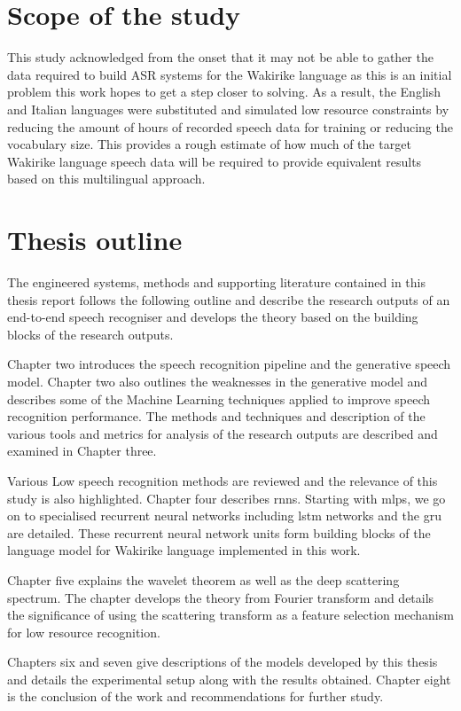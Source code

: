 \section{Scope of the study}
This study acknowledged from the onset that it may not be able to gather the data required to build ASR systems for the Wakirike language as this is an initial problem this work hopes to get a step closer to solving.  As a result, the English and Italian languages were substituted and simulated low resource constraints by reducing the amount of hours of recorded speech data for training or reducing the vocabulary size.  This provides a rough estimate of how much of the target Wakirike language speech data will be required to provide equivalent results based on this multilingual approach.
\stopblue

\section{Thesis outline}
The engineered systems, methods and supporting literature contained in this thesis report follows the following outline and describe the research outputs of an end-to-end speech recogniser and develops the theory based on the building blocks of the research outputs.

Chapter two introduces the speech recognition pipeline and the generative speech model.  Chapter two also outlines the weaknesses in the generative model and describes some of the Machine Learning techniques applied to improve speech recognition performance.  The methods and techniques and description of the various tools and metrics for analysis of the research outputs are described and examined in Chapter three.

Various Low speech recognition methods are reviewed and the relevance of this study is also highlighted.  Chapter four describes \acrfull{rnns}. Starting with \acrfull{mlps}, we go on to specialised recurrent neural networks including \acrfull{lstm} networks and the \acrfull{gru} are detailed. These recurrent neural network units form building blocks of the language model for Wakirike language implemented in this work.

Chapter five explains the wavelet theorem as well as the deep scattering spectrum. The chapter develops the theory from Fourier transform and details the significance of using the scattering transform as a feature selection mechanism for low resource recognition.  

Chapters six and seven give descriptions of the models developed by this thesis and details the experimental setup along with the results obtained. Chapter eight is the conclusion of the work and recommendations for further study. 

